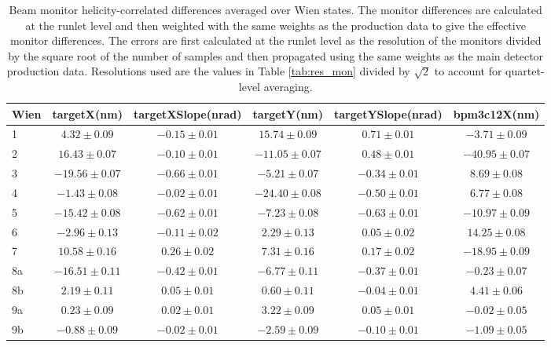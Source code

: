 \begin{landscape}
\begin{table}[h]
\begin{center}
\caption{\label{tab:monitor_diff_by_wien}Beam monitor helicity-correlated differences averaged over Wien states. The monitor differences are calculated at the runlet level and then weighted with the same weights as the production data to give the effective monitor differences. The errors are first calculated at the runlet level as the resolution of the monitors divided by the square root of the number of samples and then propagated using the same weights as the main detector production data. Resolutions used are the values in Table \ref{tab:res_mon} divided by $\sqrt{2}$ to account for quartet-level averaging.}
\begin{tabular}{|l|c|c|c|c|c|}\hline
Wien&targetX(nm)&targetXSlope(nrad)&targetY(nm)&targetYSlope(nrad)&bpm3c12X(nm)\\\hline\hline
1 &$4.32\pm 0.09$&$-0.15\pm 0.01$&$15.74\pm 0.09$&$0.71\pm 0.01$&$-3.71\pm 0.09$\\\hline
2 &$16.43\pm 0.07$&$-0.10\pm 0.01$&$-11.05\pm 0.07$&$0.48\pm 0.01$&$-40.95\pm 0.07$\\\hline
3 &$-19.56\pm 0.07$&$-0.66\pm 0.01$&$-5.21\pm 0.07$&$-0.34\pm 0.01$&$8.69\pm 0.08$\\\hline
4 &$-1.43\pm 0.08$&$-0.02\pm 0.01$&$-24.40\pm 0.08$&$-0.50\pm 0.01$&$6.77\pm 0.08$\\\hline
5 &$-15.42\pm 0.08$&$-0.62\pm 0.01$&$-7.23\pm 0.08$&$-0.63\pm 0.01$&$-10.97\pm 0.09$\\\hline
6 &$-2.96\pm 0.13$&$-0.11\pm 0.02$&$2.29\pm 0.13$&$0.05\pm 0.02$&$14.25\pm 0.08$\\\hline
7 &$10.58\pm 0.16$&$0.26\pm 0.02$&$7.31\pm 0.16$&$0.17\pm 0.02$&$-18.95\pm 0.09$\\\hline
8a&$-16.51\pm 0.11$&$-0.42\pm 0.01$&$-6.77\pm 0.11$&$-0.37\pm 0.01$&$-0.23\pm 0.07$\\\hline
8b&$2.19\pm 0.11$&$0.05\pm 0.01$&$0.60\pm 0.11$&$-0.04\pm 0.01$&$4.41\pm 0.06$\\\hline
9a&$0.23\pm 0.09$&$0.02\pm 0.01$&$3.22\pm 0.09$&$0.05\pm 0.01$&$-0.02\pm 0.05$\\\hline
9b&$-0.88\pm 0.09$&$-0.02\pm 0.01$&$-2.59\pm 0.09$&$-0.10\pm 0.01$&$-1.09\pm 0.05$\\\hline
\end{tabular}
\end{center}
\end{table}
\end{landscape}
